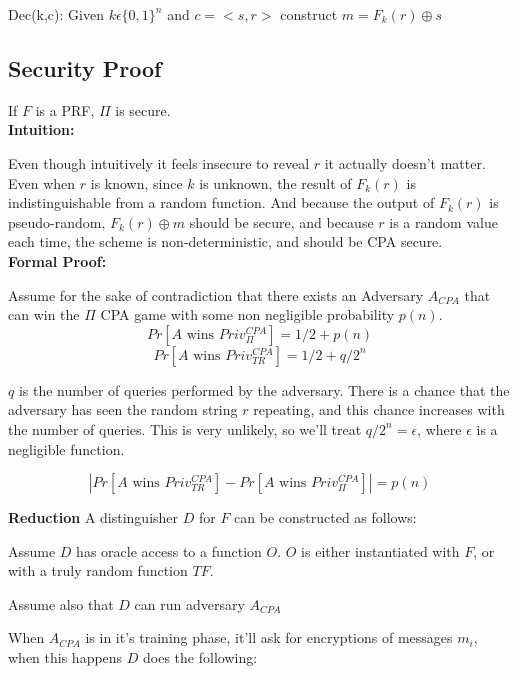 \documentclass[11pt]{article}
\begin{document}
\hspace{\parindent} Dec(k,c): Given $k \epsilon \{0,1\}^n$ and $c=<s,r>$ construct $m= F_k(r)\oplus s$


\subsection*{Security Proof}

If $F$ is a PRF, $\Pi$ is secure.\\

\textbf{Intuition:}

Even though intuitively it feels insecure to reveal $r$ it actually doesn't matter. Even when $r$ is known, since $k$ is unknown, the result of $F_k(r)$ is indistinguishable from a random function. And because the output of $F_k(r)$ is pseudo-random, $F_k(r) \oplus m $ should be secure, and because $r$ is a random value each time, the scheme is non-deterministic, and should be CPA secure. \\


\textbf{Formal Proof:}

Assume for the sake of contradiction that there exists an Adversary $A_{CPA}$ that can win the $\Pi$ CPA game with some non negligible probability $p(n)$.\\


$$Pr[A \textrm{ wins } Priv_\Pi^{CPA}] = 1/2 + p(n)$$
$$Pr[A \textrm{ wins } Priv_{TR}^{CPA}] = 1/2 + q/2^n$$

$q$ is the number of queries performed by the adversary. There is a chance that the adversary has seen the random string $r$ repeating, and this chance increases with the number of queries. This is very unlikely, so we'll treat $q/2^n = \epsilon$, where $\epsilon$ is a negligible function.


$$|Pr[A \textrm{ wins } Priv_{TR}^{CPA}]-Pr[A \textrm{ wins } Priv_\Pi^{CPA}] | = p(n)$$

\textbf{Reduction}
A distinguisher $D$ for $F$ can be constructed as follows:

	\hspace{\parindent}Assume $D$ has oracle access to a function $O$. $O$ is either instantiated with $F$, or with a truly random function $TF$.
	
	\hspace{\parindent}Assume also that $D$ can run adversary $A_{CPA}$
	
	\hspace{\parindent}When $A_{CPA}$ is in it's training phase, it'll ask for encryptions of messages $m_i$, when this happens $D$ does the following:
	
\end{document}
